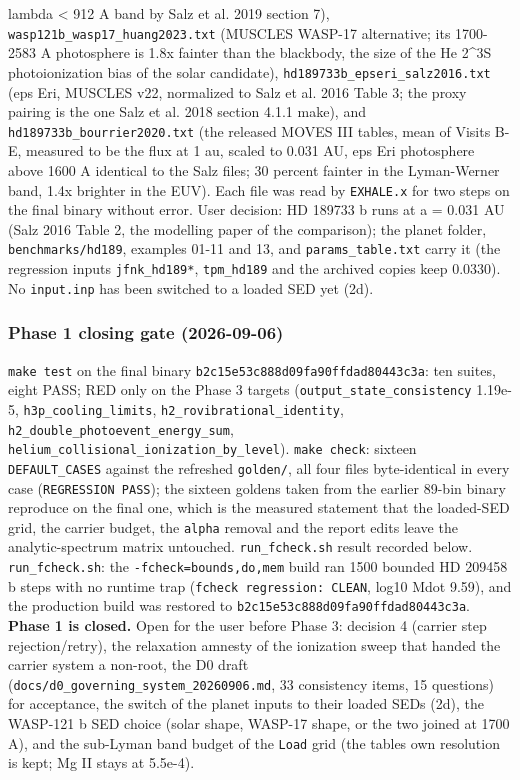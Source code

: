 \documentclass[english,a4paper]{my_memo}
\begin{document}
\begin{itemize}
  lambda \textless{} 912 A band by Salz et al. 2019 section 7),
  \texttt{wasp121b\_wasp17\_huang2023.txt} (MUSCLES WASP-17 alternative; its 1700-2583
  A photosphere is 1.8x fainter than the blackbody, the size of the He 2\^{}3S
  photoionization bias of the solar candidate), \texttt{hd189733b\_epseri\_salz2016.txt}
  (eps Eri, MUSCLES v22, normalized to Salz et al. 2016 Table 3; the proxy
  pairing is the one Salz et al. 2018 section 4.1.1 make), and
  \texttt{hd189733b\_bourrier2020.txt} (the released MOVES III tables, mean of
  Visits B-E, measured to be the flux at 1 au, scaled to 0.031 AU, eps Eri
  photosphere above 1600 A identical to the Salz file\textquotesingle s; 30 percent fainter
  in the Lyman-Werner band, 1.4x brighter in the EUV). Each file was read by
  \texttt{EXHALE.x} for two steps on the final binary without error. User decision:
  HD 189733 b runs at a = 0.031 AU (Salz 2016 Table 2, the modelling paper
  of the comparison); the planet folder, \texttt{benchmarks/hd189}, examples 01-11
  and 13, and \texttt{params\_table.txt} carry it (the regression inputs
  \texttt{jfnk\_hd189*}, \texttt{tpm\_hd189} and the archived copies keep 0.0330). No
  \texttt{input.inp} has been switched to a loaded SED yet (2d).
\end{itemize}

\subsubsection{Phase 1 closing gate (2026-09-06)}\label{phase-1-closing-gate-2026-09-06}

\texttt{make\ test} on the final binary \texttt{b2c15e53c888d09fa90ffdad80443c3a}: ten
suites, eight PASS; RED only on the Phase 3 targets (\texttt{output\_state\_consistency}
1.19e-5, \texttt{h3p\_cooling\_limits}, \texttt{h2\_rovibrational\_identity},
\texttt{h2\_double\_photoevent\_energy\_sum}, \texttt{helium\_collisional\_ionization\_by\_level}).
\texttt{make\ check}: sixteen \texttt{DEFAULT\_CASES} against the refreshed \texttt{golden/}, all
four files byte-identical in every case (\texttt{REGRESSION\ PASS}); the sixteen
goldens taken from the earlier 89-bin binary reproduce on the final one,
which is the measured statement that the loaded-SED grid, the carrier budget,
the \texttt{alpha} removal and the report edits leave the analytic-spectrum matrix
untouched. \texttt{run\_fcheck.sh} result recorded below.
\texttt{run\_fcheck.sh}: the \texttt{-fcheck=bounds,do,mem} build ran 1500 bounded HD 209458 b
steps with no runtime trap (\texttt{fcheck\ regression:\ CLEAN}, log10 Mdot 9.59), and
the production build was restored to \texttt{b2c15e53c888d09fa90ffdad80443c3a}.
\textbf{Phase 1 is closed.} Open for the user before Phase 3: decision 4 (carrier
step rejection/retry), the relaxation amnesty of the ionization sweep that
handed the carrier system a non-root, the D0 draft
(\texttt{docs/d0\_governing\_system\_20260906.md}, 33 consistency items, 15 questions)
for acceptance, the switch of the planet inputs to their loaded SEDs (2d), the
WASP-121 b SED choice (solar shape, WASP-17 shape, or the two joined at 1700 A),
and the sub-Lyman band budget of the \texttt{Load} grid (the table\textquotesingle s own resolution
is kept; Mg II stays at 5.5e-4).
\end{document}
